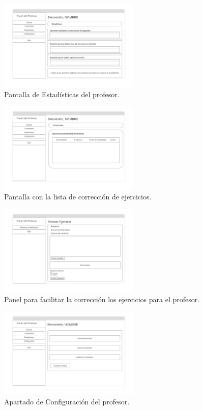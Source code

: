 \begin{figure}[H]
    \centering
    \includegraphics[width=0.6\textwidth]{imagenes/Mockups/12-Profesor-Estadisticas.png}
    \caption{Pantalla de Estadísticas del profesor.}
\end{figure}

\begin{figure}[H]
    \centering
    \includegraphics[width=0.6\textwidth]{imagenes/Mockups/13-Profesor-Corregir.png}
    \caption{Pantalla con la lista de corrección de ejercicios.}
\end{figure}

\begin{figure}[H]
    \centering
    \includegraphics[width=0.6\textwidth]{imagenes/Mockups/14-Profesor-Corregir-Ejercicio.png}
    \caption{Panel para facilitar la corrección los ejercicios para el profesor.}
\end{figure}

\begin{figure}[H]
    \centering
    \includegraphics[width=0.6\textwidth]{imagenes/Mockups/15-Profesor-Configuracion.png}
    \caption{Apartado de Configuración del profesor.}
\end{figure}

